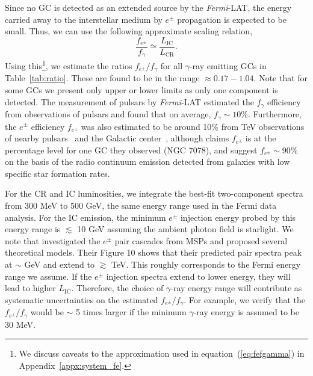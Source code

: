 \documentclass[doublespace,draft,nopageskip]{VTthesis} %
\begin{document}
Since no GC is detected as an extended source by the \textit{Fermi}-LAT, the energy carried away to the interstellar medium by $e^\pm$ propagation is expected to be small. Thus, we can use the following approximate scaling relation,
\begin{equation}\label{eq:fefgamma}
    \dfrac{f_{e^\pm}}{f_\gamma} \simeq \dfrac{L_\mathrm{IC}}{L_\mathrm{CR}}.
\end{equation}
Using this\footnote{We discuss caveats to the approximation used in equation~(\ref{eq:fefgamma}) in Appendix~\ref{appx:system_fe}.}, we estimate the ratios $f_{e^\pm}/f_\gamma$ for all $\gamma$-ray emitting GCs in Table~\ref{tab:ratio}. These are found to be in the range $\approx 0.17 - 1.04$. Note that for some GCs we present only upper or lower limits as only one component is detected. The measurement of pulsars by \textit{Fermi}-LAT estimated the $f_{\gamma}$ efficiency from observations of pulsars and found that on average, $f_\gamma \sim \mathrm{10\%}$. Furthermore, the $e^\pm$ efficiency $f_{e^\pm}$ was also estimated to be around 10\% from TeV observations of {nearby pulsars~\citep{2017PhRvD..96j3013H, 2018PhRvD..98d3005H, 2021arXiv210400014H} and} the Galactic center~\citep{2013MNRAS.435L..14B}, although \citet{2019MNRAS.484.2876M} claims $f_{e^\pm}$ is at the percentage level for one GC they observed (NGC 7078), and \citet{2020arXiv200508982S} suggest $f_{e^\pm} \sim 90\%$ on the basis of the  radio continuum emission detected from galaxies with low specific star formation rates.

For the CR and IC luminosities, we integrate the best-fit two-component spectra from 300 MeV to 500 GeV, the same energy range used in the Fermi data analysis. For the IC emission, the minimum $e^\pm$ injection energy probed by this energy range is $\lesssim$ 10 GeV assuming the ambient photon field is starlight. We note that \citet{2011ApJ...743..181H} investigated the $e^\pm$ pair cascades from MSPs and proposed several theoretical models. Their Figure 10 shows that their predicted pair spectra peak at $\sim$ GeV and extend to $\gtrsim$ TeV. This roughly corresponds to the Fermi energy range we assume. If the $e^\pm$ injection spectra extend to lower energy, they will lead to higher $L_\mathrm{IC}$. Therefore, the choice of $\gamma$-ray energy range will contribute as systematic uncertainties on the estimated $f_{e^\pm}/f_\gamma$. For example, we verify that the $f_{e^\pm}/f_\gamma$ would be $\sim$ 5 times larger if the minimum $\gamma$-ray energy is assumed to be 30 MeV.
\end{document}
